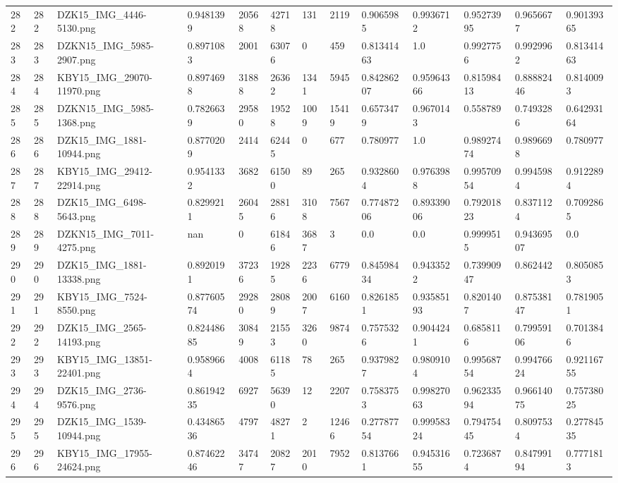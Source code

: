 \documentclass[11pt, a4paper, twoside]{report}
\begin{document}
\begin{longtable}[c]{@{}lllllllllllll@{}}
282 & 282 & DZK15\_IMG\_4446-5130.png & 0.9481399 & 20568 & 42718 & 131 & 2119 & 0.9065985 & 0.9936712 & 0.95273995 & 0.9656677 & 0.90139365 \\
283 & 283 & DZKN15\_IMG\_5985-2907.png & 0.8971083 & 2001 & 63076 & 0 & 459 & 0.81341463 & 1.0 & 0.9927756 & 0.9929962 & 0.81341463 \\
284 & 284 & KBY15\_IMG\_29070-11970.png & 0.8974698 & 31888 & 26362 & 1341 & 5945 & 0.84286207 & 0.95964366 & 0.81598413 & 0.88882446 & 0.8140093 \\
285 & 285 & DZKN15\_IMG\_5985-1368.png & 0.7826639 & 29580 & 19528 & 1009 & 15419 & 0.6573479 & 0.9670143 & 0.558789 & 0.7493286 & 0.64293164 \\
286 & 286 & DZK15\_IMG\_1881-10944.png & 0.8770209 & 2414 & 62445 & 0 & 677 & 0.780977 & 1.0 & 0.98927474 & 0.9896698 & 0.780977 \\
287 & 287 & KBY15\_IMG\_29412-22914.png & 0.9541332 & 3682 & 61500 & 89 & 265 & 0.9328604 & 0.9763988 & 0.99570954 & 0.9945984 & 0.9122894 \\
288 & 288 & DZK15\_IMG\_6498-5643.png & 0.8299211 & 26045 & 28816 & 3108 & 7567 & 0.77487206 & 0.89339006 & 0.79201823 & 0.8371124 & 0.7092865 \\
289 & 289 & DZKN15\_IMG\_7011-4275.png & nan & 0 & 61846 & 3687 & 3 & 0.0 & 0.0 & 0.9999515 & 0.94369507 & 0.0 \\
290 & 290 & DZK15\_IMG\_1881-13338.png & 0.8920191 & 37236 & 19285 & 2236 & 6779 & 0.84598434 & 0.9433522 & 0.73990947 & 0.862442 & 0.8050853 \\
291 & 291 & KBY15\_IMG\_7524-8550.png & 0.87760574 & 29280 & 28089 & 2007 & 6160 & 0.8261851 & 0.93585193 & 0.8201407 & 0.87538147 & 0.7819051 \\
292 & 292 & DZK15\_IMG\_2565-14193.png & 0.82448685 & 30849 & 21553 & 3260 & 9874 & 0.7575326 & 0.9044241 & 0.6858116 & 0.79959106 & 0.7013846 \\
293 & 293 & KBY15\_IMG\_13851-22401.png & 0.9589664 & 4008 & 61185 & 78 & 265 & 0.9379827 & 0.9809104 & 0.99568754 & 0.99476624 & 0.92116755 \\
294 & 294 & DZK15\_IMG\_2736-9576.png & 0.86194235 & 6927 & 56390 & 12 & 2207 & 0.7583753 & 0.99827063 & 0.96233594 & 0.96614075 & 0.75738025 \\
295 & 295 & DZK15\_IMG\_1539-10944.png & 0.43486536 & 4797 & 48271 & 2 & 12466 & 0.27787754 & 0.99958324 & 0.79475445 & 0.8097534 & 0.27784535 \\
296 & 296 & KBY15\_IMG\_17955-24624.png & 0.87462246 & 34747 & 20827 & 2010 & 7952 & 0.8137661 & 0.94531655 & 0.7236874 & 0.84799194 & 0.7771813 \\

\end{longtable}
\end{document}

